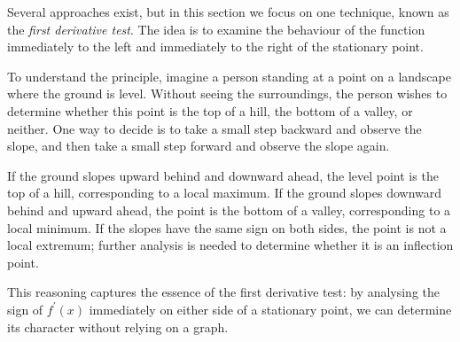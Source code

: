 Several approaches exist, but in this section we focus on one technique, known as the \emph{first derivative test}. The idea is to examine the behaviour of the function immediately to the left and immediately to the right of the stationary point.

To understand the principle, imagine a person standing at a point on a landscape where the ground is level. Without seeing the surroundings, the person wishes to determine whether this point is the top of a hill, the bottom of a valley, or neither. One way to decide is to take a small step backward and observe the slope, and then take a small step forward and observe the slope again.

If the ground slopes upward behind and downward ahead, the level point is the top of a hill, corresponding to a local maximum. If the ground slopes downward behind and upward ahead, the point is the bottom of a valley, corresponding to a local minimum. If the slopes have the same sign on both sides, the point is not a local extremum; further analysis is needed to determine whether it is an inflection point.

This reasoning captures the essence of the first derivative test: by analysing the sign of \(f^{\prime}(x)\) immediately on either side of a stationary point, we can determine its character without relying on a graph.



